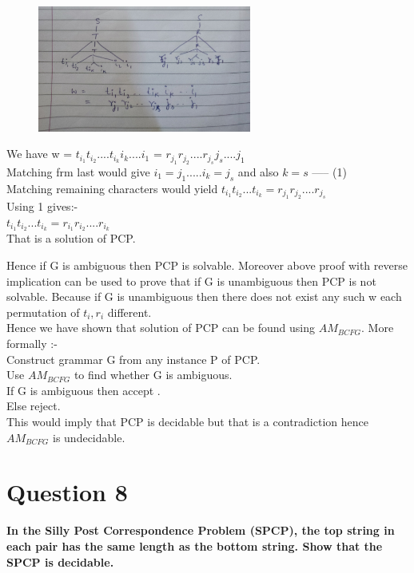 \documentclass{article}
\begin{document}
\begin{enumerate}
    \begin{figure}[H]
        \centering
        \includegraphics[width=7cm]{2.jpg}
    \end{figure}

    We have w = $t_{i_1}t_{i_2}....t_{i_k}i_k....i_1$ = $r_{j_1}r_{j_2}....r_{j_s}j_s....j_1$\\
    Matching frm last would give $i_1 = j_1 ..... i_k = j_s$ and also $k=s$ ----- (1)\\
    Matching remaining characters would yield $t_{i_1}t_{i_2}...t_{i_k} = r_{j_1}r_{j_2}....r_{j_s}$\\
    Using 1 gives:- \\
    $t_{i_1}t_{i_2}...t_{i_k} = r_{i_1}r_{i_2}....r_{i_k}$\\
    That is a solution of PCP.\\
\end{enumerate}
Hence if G is ambiguous then PCP is solvable. Moreover above proof with reverse implication can be used to prove that if G is unambiguous then PCP is not solvable. Because 
if G is unambiguous then there does not exist any such w each permutation of $t_i , r_i$ different.\\

Hence we have shown that solution of PCP can be found using $AM_{BCFG}$. More formally :- \\
Construct grammar G from any instance P of PCP.\\
Use $AM_{BCFG}$ to find whether G is ambiguous.\\
If G is ambiguous then accept .\\
Else reject.\\

This would imply that PCP is decidable but that is a contradiction hence $AM_{BCFG}$ is undecidable.\\

\pagebreak


\section{Question 8}
\textbf{In the Silly Post Correspondence Problem (SPCP), the top string in each pair has the same
length as the bottom string. Show that the SPCP is decidable.\\}
\end{document}
